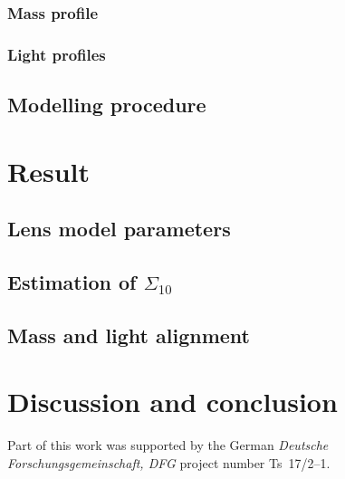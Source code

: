 \documentclass{aa}
\begin{document}
\subsubsection{Mass profile}

\subsubsection{Light profiles}


\subsection{Modelling procedure}


\section{Result} \label{sec:result}

\subsection{Lens model parameters}


\subsection{Estimation of $\Sigma_{10}$}

\subsection{Mass and light alignment}


\section{Discussion and conclusion} \label{sec:discussion}

\begin{acknowledgements}
      Part of this work was supported by the German
      \emph{Deut\-sche For\-schungs\-ge\-mein\-schaft, DFG\/} project
      number Ts~17/2--1.
\end{acknowledgements}

%
%

\end{document}

